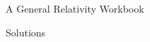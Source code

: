 \documentclass[11pt,fleqn]{book} %
\begin{document}

\begingroup
\thispagestyle{empty}
\centering
\vspace*{5cm}
\par\normalfont\fontsize{35}{35}\sffamily\selectfont
{\LARGE A General Relativity Workbook}\par %
\vspace*{1cm}
{\Huge Solutions}\par %
\endgroup


\newpage
~\vfill
\thispagestyle{empty}


%
%




\pagestyle{empty} %

\tableofcontents %


\pagestyle{fancy} %
\end{document}

